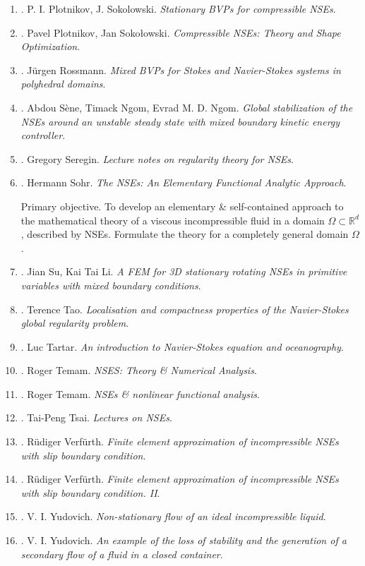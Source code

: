 \documentclass{article}
\begin{document}
\begin{enumerate}
	\item \cite{Plotnikov_Sokolowski2008}. {\sc P. I. Plotnikov, J. Sokolowski}. {\it Stationary BVPs for compressible NSEs}.
	\item \cite{Plotnikov_Sokolowski2012}. {\sc Pavel Plotnikov, Jan Soko\l owski}. {\it Compressible NSEs: Theory and Shape Optimization}.
	\item \cite{Rossmann2009}. {\sc J\"{u}rgen Rossmann}. {\it Mixed BVPs for Stokes and Navier-Stokes systems in polyhedral domains}.
	\item \cite{Sene_Ngom_Ngom2019}. {\sc Abdou S\`ene, Timack Ngom, Evrad M. D. Ngom}. {\it Global stabilization of the NSEs around an unstable steady state with mixed boundary kinetic energy controller}.
	\item \cite{Seregin2015}. {\sc Gregory Seregin}. {\it Lecture notes on regularity theory for NSEs}.	 
	\item \cite{Sohr2001,Sohr2013}. {\sc Hermann Sohr}. {\it The NSEs: An Elementary Functional Analytic Approach}.
	
	{\sf Primary objective.} To develop an elementary \& self-contained approach to the mathematical theory of a viscous incompressible fluid in a domain $\Omega\subset\mathbb{R}^d$, described by NSEs. Formulate the theory for a completely general domain $\Omega$.
	\item \cite{Su_Li2008}. {\sc Jian Su, Kai Tai Li}. {\it A FEM for 3D stationary rotating NSEs in primitive variables with mixed boundary conditions}.
	\item \cite{Tao2013}. {\sc Terence Tao}. {\it Localisation and compactness properties of the Navier-Stokes global regularity problem}.
	\item \cite{Tartar2006}. {\sc Luc Tartar}. {\it An introduction to {N}avier-{S}tokes equation and oceanography}.
	\item \cite{Temam1977,Temam2000}. {\sc Roger Temam}. {\it NSES: Theory \& Numerical Analysis}.
	\item \cite{Temam1983,Temam1995}. {\sc Roger Temam}. {\it NSEs \& nonlinear functional analysis}.
	\item \cite{Tsai2018}. {\sc Tai-Peng Tsai}. {\it Lectures on NSEs}.
	\item \cite{Verfurth1987}. {\sc R\"{u}diger Verf\"{u}rth}. {\it Finite element approximation of incompressible NSEs with slip boundary condition}.
	\item \cite{Verfurth1991}. {\sc R\"{u}diger Verf\"{u}rth}. {\it Finite element approximation of incompressible NSEs with slip boundary condition. II}.
	\item \cite{Yudovich1963}. {\sc V. I. Yudovich}. {\it Non-stationary flow of an ideal incompressible liquid}.
	\item \cite{Yudovich1967}. {\sc V. I. Yudovich}. {\it An example of the loss of stability and the generation of a secondary flow of a fluid in a closed container}.
\end{enumerate}
\end{document}

